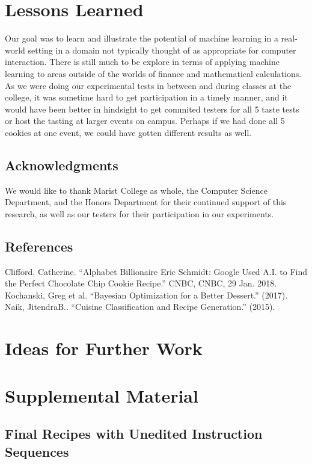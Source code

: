 \documentclass[11pt, a4paper]{article}
\begin{document}
		\section{Lessons Learned}
		Our goal was to learn and illustrate the potential of machine learning in a real-world setting in a domain not typically thought of as appropriate for computer interaction. There is still much to be explore in terms of applying machine learning to areas outside of the worlds of finance and mathematical calculations. As we were doing our experimental tests in between and during classes at the college, it was sometime hard to get participation in a timely manner, and it would have been better in hindsight to get commited testers for all 5 taste tests or host the tasting at larger events on campus. Perhaps if we had done all 5 cookies at one event, we could have gotten different results as well.

		\subsection*{Acknowledgments}
		We would like to thank Marist College as whole, the Computer Science Department, and the Honors Department for their continued support of this research, as well as our testers for their participation in our experiments.
		\subsection*{References}
		Clifford, Catherine. “Alphabet Billionaire Eric Schmidt: Google Used A.I. to Find the Perfect Chocolate Chip Cookie Recipe.” CNBC, CNBC, 29 Jan. 2018.
		\newline
		Kochanski, Greg et al. “Bayesian Optimization for a Better Dessert.” (2017).
		\newline
		Naik, JitendraB.. “Cuisine Classification and Recipe Generation.” (2015).
		\section{Ideas for Further Work}
		\section{Supplemental Material}
		\subsection{Final Recipes with Unedited Instruction Sequences}
\end{document}
